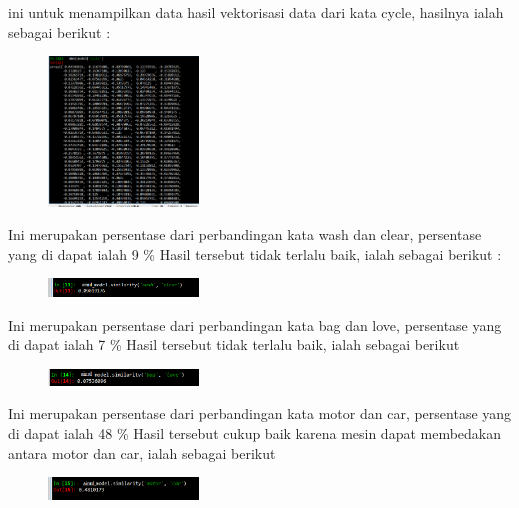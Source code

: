 \begin{enumerate}
	\hfill\break
	
	ini untuk menampilkan data hasil vektorisasi data dari kata cycle, hasilnya ialah sebagai berikut : 
	\begin{figure}[H]
	\centering
		\includegraphics[width=4cm]{figures/1174073/tugas5/materi/hasil1_12.PNG}
	\end{figure}

	\hfill\break
	
	Ini merupakan persentase dari perbandingan kata wash dan clear, persentase yang di dapat ialah 9 \% Hasil tersebut tidak terlalu baik, ialah sebagai berikut : 
	\begin{figure}[H]
	\centering
		\includegraphics[width=4cm]{figures/1174073/tugas5/materi/hasil1_13.PNG}
	\end{figure}

	\hfill\break
	
	Ini merupakan persentase dari perbandingan kata bag dan love, persentase yang di dapat ialah 7 \% Hasil tersebut tidak terlalu baik, ialah sebagai berikut 
	\begin{figure}[H]
	\centering
		\includegraphics[width=4cm]{figures/1174073/tugas5/materi/hasil1_14.PNG}
	\end{figure}

	\hfill\break
	
	Ini merupakan persentase dari perbandingan kata motor dan car, persentase yang di dapat ialah 48 \% Hasil tersebut cukup baik karena mesin dapat membedakan antara motor dan car, ialah sebagai berikut 
	\begin{figure}[H]
	\centering
		\includegraphics[width=4cm]{figures/1174073/tugas5/materi/hasil1_15.PNG}
	\end{figure}


\end{enumerate}
